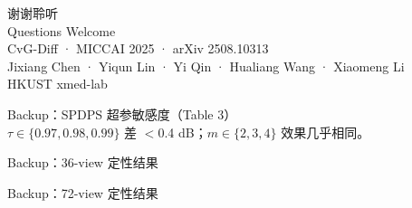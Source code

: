 \documentclass[aspectratio=169,10pt]{beamer}
\begin{document}
{
\begin{frame}[plain]
  \vfill
  \centering
  {\color{white}\fontsize{36}{44}\selectfont 谢谢聆听}\\[0.5em]
  {\color{Brick}\large Questions Welcome}\\[2em]
  {\color{NavyLight}\normalsize
    CvG-Diff · MICCAI 2025 · arXiv 2508.10313}\\[0.3em]
  {\color{InkSoft}\small
    Jixiang Chen · Yiqun Lin · Yi Qin · Hualiang Wang · Xiaomeng Li\\[0.2em]
    HKUST xmed-lab}
  \vfill
\end{frame}
}

\appendix

\begin{frame}{Backup：SPDPS 超参敏感度（Table 3）}
  \vspace{0.5em}
  \centering
  \\[0.5em]
  \small\centering
  $\tau\in\{0.97,0.98,0.99\}$ 差 $<$0.4 dB；$m\in\{2,3,4\}$ 效果几乎相同。
\end{frame}

\begin{frame}{Backup：36-view 定性结果}
  \vspace{0.5em}
  \centering
\end{frame}

\begin{frame}{Backup：72-view 定性结果}
  \vspace{0.5em}
  \centering
\end{frame}
\end{document}
